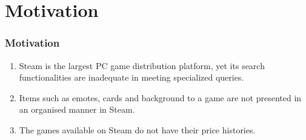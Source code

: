 \section{Motivation}
\begin{frame}
\frametitle{Motivation}

\begin{enumerate}
	\setlength\itemsep{1em}
	\item Steam is the largest PC game distribution platform, yet its search functionalities are inadequate in meeting specialized queries.
	\item Items such as emotes, cards and background to a game are not presented in an organised manner in Steam.
	\item The games available on Steam do not have their price histories.

\end{enumerate}


\end{frame}
